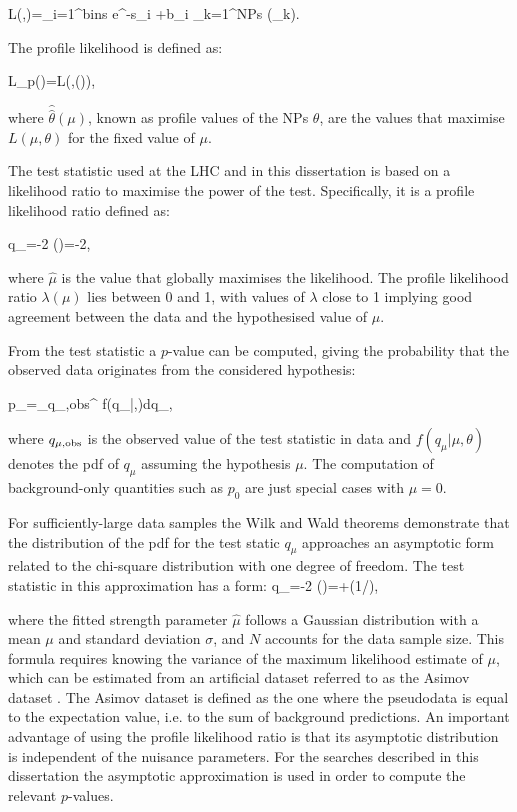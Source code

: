 \be
L(\mu,\theta)=\displaystyle\prod_{i=1}^{bins}  e^{-\mu s_{i} +b_{i}} \displaystyle\prod_{k=1}^{NPs} \rho(\theta_{k}).
\ee

\noindent The profile likelihood is defined as:

\be
L_{p}(\mu)=L(\mu,\hat{\hat{\theta}}(\mu)),
\ee

\noindent where $\hat{\hat{\theta}}(\mu)$, known as profile values of the NPs $\theta$, are the values that maximise $L(\mu,\theta)$ for the fixed value of $\mu$.

The test statistic used at the LHC and in this dissertation is based on a likelihood ratio to maximise the power of the test. Specifically, it is a profile likelihood ratio \cite{Cowan:2010js} defined as:

\be
q_{\mu}=-2 \ln\lambda(\mu)=-2\ln{},
\ee 

\noindent where $\hat{\mu}$ is the value that globally maximises the likelihood. The profile likelihood ratio $\lambda(\mu)$ lies between 0 and 1, with values of $\lambda$ close to 1 implying good agreement between the data and the hypothesised value of $\mu$.\par
From the test statistic a $p$-value can be computed, giving the probability that the observed data originates from the considered hypothesis:

\be
p_{\mu}=\int_{q_{\mu,{\rm obs}}}^{\infty} f(q_{\mu}|\mu,\theta)dq_{\mu},
\ee

\noindent where $q_{\mu,{\rm obs}}$ is the observed value of the test statistic in data and $f(q_{\mu}|\mu,\theta)$ denotes the pdf of $q_{\mu}$ assuming the hypothesis $\mu$. The computation of background-only quantities such as $p_{0}$ are just special cases with $\mu = 0$.

For sufficiently-large data samples the Wilk and Wald theorems \cite{WaldApprox} demonstrate that the distribution of the pdf for the test static $q_{\mu}$ approaches an asymptotic form related to the chi-square distribution with one degree of freedom. 
The test statistic in this approximation has a form:
\be
q_{\mu}=-2 \ln\lambda(\mu)=+(1/),
\ee

\noindent where the fitted strength parameter $\hat{\mu}$ follows a Gaussian distribution with a mean $\mu$ and standard deviation $\sigma$, and $N$ accounts for the data sample size. This formula requires knowing the variance of the maximum likelihood estimate of $\mu$, which can be estimated from an artificial dataset referred to as the Asimov dataset \cite{Cowan:2010js}. The Asimov dataset is defined as the one where the pseudodata is equal to the expectation value, i.e. to the sum of background predictions. An important advantage of using the profile likelihood ratio is that its asymptotic distribution is independent of the nuisance parameters. For the searches described in this dissertation the asymptotic approximation \cite{Cowan:2010js} is used in order to compute the relevant $p$-values.
